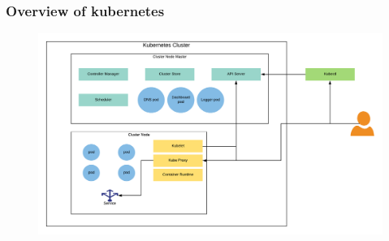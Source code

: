 \documentclass{beamer}
\begin{document}
\begin{frame}
\frametitle{Overview of kubernetes}
\begin{figure}
\includegraphics[width=\linewidth]{images/KubernetesOverview.png}
\end{figure}

\end{frame}
\end{document}
